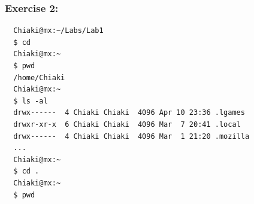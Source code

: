 \documentclass{article}
\begin{document}
\subsubsection{Exercise 2:}
\begin{verbatim}
  Chiaki@mx:~/Labs/Lab1                                                                                                                                                                                          
  $ cd                                                                                                                                                                                                           
  Chiaki@mx:~                                                                                                                                                                                                    
  $ pwd                                                                                                                                                                                                          
  /home/Chiaki
  Chiaki@mx:~                                                                                                                                                                                                    
  $ ls -al
  drwx------  4 Chiaki Chiaki  4096 Apr 10 23:36 .lgames                                                                                                                                                         
  drwxr-xr-x  6 Chiaki Chiaki  4096 Mar  7 20:41 .local                                                                                                                                                          
  drwx------  4 Chiaki Chiaki  4096 Mar  1 21:20 .mozilla 
  ...
  Chiaki@mx:~                                                                                                                                                                                                    
  $ cd .                                                                                                                                                                                                         
  Chiaki@mx:~                                                                                                                                                                                                    
  $ pwd                                                                                                                                                                                                          

\end{verbatim}
\end{document}
